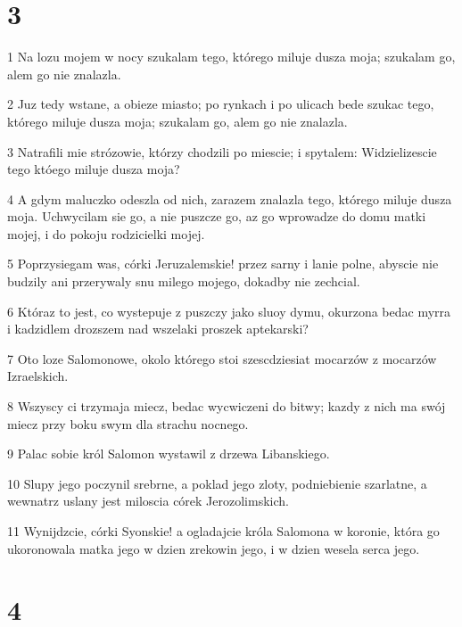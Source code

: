 \chapter{3}

\par 1 Na lozu mojem w nocy szukalam tego, którego miluje dusza moja; szukalam go, alem go nie znalazla.
\par 2 Juz tedy wstane, a obieze miasto; po rynkach i po ulicach bede szukac tego, którego miluje dusza moja; szukalam go, alem go nie znalazla.
\par 3 Natrafili mie strózowie, którzy chodzili po miescie; i spytalem: Widzielizescie tego któego miluje dusza moja?
\par 4 A gdym maluczko odeszla od nich, zarazem znalazla tego, którego miluje dusza moja. Uchwycilam sie go, a nie puszcze go, az go wprowadze do domu matki mojej, i do pokoju rodzicielki mojej.
\par 5 Poprzysiegam was, córki Jeruzalemskie! przez sarny i lanie polne, abyscie nie budzily ani przerywaly snu milego mojego, dokadby nie zechcial.
\par 6 Któraz to jest, co wystepuje z puszczy jako sluoy dymu, okurzona bedac myrra i kadzidlem drozszem nad wszelaki proszek aptekarski?
\par 7 Oto loze Salomonowe, okolo którego stoi szescdziesiat mocarzów z mocarzów Izraelskich.
\par 8 Wszyscy ci trzymaja miecz, bedac wycwiczeni do bitwy; kazdy z nich ma swój miecz przy boku swym dla strachu nocnego.
\par 9 Palac sobie król Salomon wystawil z drzewa Libanskiego.
\par 10 Slupy jego poczynil srebrne, a poklad jego zloty, podniebienie szarlatne, a wewnatrz uslany jest miloscia córek Jerozolimskich.
\par 11 Wynijdzcie, córki Syonskie! a ogladajcie króla Salomona w koronie, która go ukoronowala matka jego w dzien zrekowin jego, i w dzien wesela serca jego.

\chapter{4}

